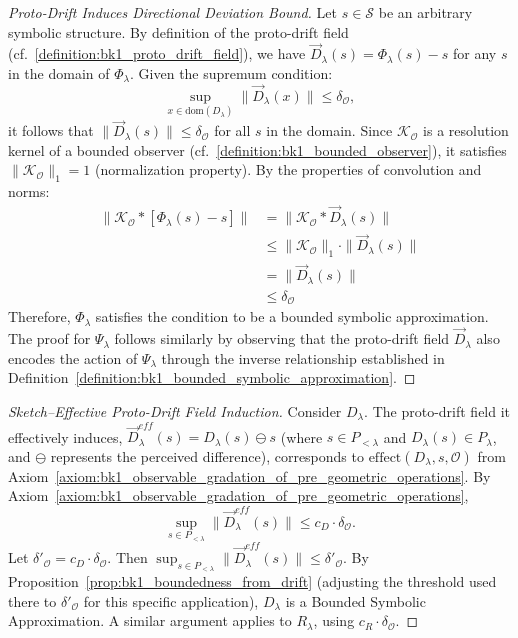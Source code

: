 \begin{proof}[Proto-Drift Induces Directional Deviation Bound]
\label{proof:bk1_drift_deviation_bound}
Let $s \in \mathcal{S}$ be an arbitrary symbolic structure. By definition of the proto-drift field (cf.~\ref{definition:bk1_proto_drift_field}), we have $\vec{D}_\lambda(s) = \Phi_\lambda(s) - s$ for any $s$ in the domain of $\Phi_\lambda$. Given the supremum condition:
\[
\sup_{x \in \mathrm{dom}(D_\lambda)} \|\vec{D}_\lambda(x)\| \leq \delta_\mathcal{O},
\]
it follows that $\|\vec{D}_\lambda(s)\| \leq \delta_\mathcal{O}$ for all $s$ in the domain.  
Since $\mathcal{K}_\mathcal{O}$ is a resolution kernel of a bounded observer (cf.~\ref{definition:bk1_bounded_observer}), it satisfies $\|\mathcal{K}_\mathcal{O}\|_1 = 1$ (normalization property). By the properties of convolution and norms:
\begin{align}
\|\mathcal{K}_\mathcal{O} \ast [\Phi_\lambda(s) - s]\| &= \|\mathcal{K}_\mathcal{O} \ast \vec{D}_\lambda(s)\| \\
&\leq \|\mathcal{K}_\mathcal{O}\|_1 \cdot \|\vec{D}_\lambda(s)\| \\
&= \|\vec{D}_\lambda(s)\| \\
&\leq \delta_\mathcal{O}
\end{align}
Therefore, $\Phi_\lambda$ satisfies the condition to be a bounded symbolic approximation. The proof for $\Psi_\lambda$ follows similarly by observing that the proto-drift field $\vec{D}_\lambda$ also encodes the action of $\Psi_\lambda$ through the inverse relationship established in Definition~\ref{definition:bk1_bounded_symbolic_approximation}.
\end{proof}

\begin{proof}[Sketch–Effective Proto-Drift Field Induction]
\label{proof:bk1_sketch_effective_proto-drift_field_induction}
Consider $D_\lambda$. The proto-drift field it effectively induces, $\vec{D}_\lambda^{eff}(s) = D_\lambda(s) \ominus s$ (where $s \in P_{<\lambda}$ and $D_\lambda(s) \in P_\lambda$, and $\ominus$ represents the perceived difference), corresponds to $\text{effect}(D_\lambda, s, \mathcal{O})$ from Axiom~\ref{axiom:bk1_observable_gradation_of_pre_geometric_operations}.  
By Axiom~\ref{axiom:bk1_observable_gradation_of_pre_geometric_operations},  
\[
\sup_{s \in P_{<\lambda}} \|\vec{D}_\lambda^{eff}(s)\| \leq c_D \cdot \delta_\mathcal{O}.
\]  
Let $\delta'_\mathcal{O} = c_D \cdot \delta_\mathcal{O}$. Then $\sup_{s \in P_{<\lambda}} \|\vec{D}_\lambda^{eff}(s)\| \leq \delta'_\mathcal{O}$.  
By Proposition~\ref{prop:bk1_boundedness_from_drift} (adjusting the threshold used there to $\delta'_\mathcal{O}$ for this specific application), $D_\lambda$ is a Bounded Symbolic Approximation.  
A similar argument applies to $R_\lambda$, using $c_R \cdot \delta_\mathcal{O}$.
\end{proof}

